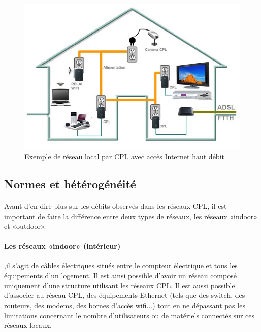     \begin{figure}[h]
        \begin{center}
            \includegraphics[scale=0.5]{./images/cpl/exempleReseauLocalCPL.jpg}
        \end{center}
            \caption{ Exemple de réseau local par CPL avec accès Internet haut débit } %
            \label{Exemple liens actuels avec CPL}
    \end{figure}

        \subsection{Normes et hétérogénéité}
            \paragraph{}
Avant d’en dire plus sur les débits observés dans les réseaux CPL, il est important de faire la différence entre deux types de réseaux,
les réseaux «indoor» et «outdoor».
            \paragraph{Les réseaux «indoor» (intérieur)}
,il s'agit de câbles électriques situés entre le compteur électrique et tous les équipements d’un logement.
Il est ainsi possible d'avoir un réseau composé uniquement d'une structure utilisant les réseaux CPL.
Il est aussi possible d'associer au réseau CPL, des équipements Ethernet (tels que des switch, des routeurs, des modems, des bornes d'accès wifi...)
tout en ne dépassant pas les limitations concernant le nombre d'utilisateurs ou de matériels connectés sur ces réseaux locaux.
